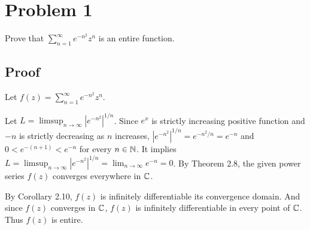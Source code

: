 \maketitle

\section*{Problem 1}

Prove that \(\sum_{n=1}^{\infty} e^{-n^2}z^n\) is an entire function.

\subsection*{Proof}

Let \(f(z) = \sum_{n=1}^{\infty} e^{-n^2}z^n\).

Let \(L = \limsup_{n \to \infty} |e^{-n^2}|^{1/n}\).
Since \(e^x\) is strictly increasing positive function
and \(-n\) is strictly decreasing as \(n\) increases,
\(|e^{-n^2}|^{1/n} = e^{-n^2 / n} = e^{-n}\)
and \(0 < e^{- (n+1)} < e^{-n}\) for every \(n \in \mathbb{N}\).
It implies \(L = \limsup_{n \to \infty} |e^{-n^2}|^{1/n} = \lim_{n \to \infty} e^{-n} = 0\).
By Theorem 2.8, the given power series \(f(z)\) converges everywhere in \(\mathbb{C}\).

By Corollary 2.10, \(f(z)\) is infinitely differentiable its convergence domain.
And since \(f(z)\) converges in \(\mathbb{C}\), \(f(z)\) is infinitely differentiable in every point of \(\mathbb{C}\).
Thus \(f(z)\) is entire.
\qedsq